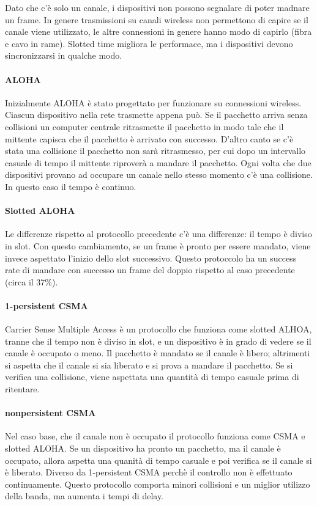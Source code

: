 \documentclass{article}
\begin{document}
Dato che c'è solo un canale, i dispositivi non possono segnalare di poter
madnare un frame. In genere trasmissioni su canali wireless non permettono di
capire se il canale viene utilizzato, le altre connessioni in genere hanno modo
di capirlo (fibra e cavo in rame).
Slotted time migliora le performace, ma i dispositivi devono sincronizzarsi in
qualche modo.

\paragraph{ALOHA}
Inizialmente ALOHA è stato progettato per funzionare su connessioni wireless.
Ciascun dispositivo nella rete trasmette appena può. Se il pacchetto arriva
senza collisioni un computer centrale ritrasmette il pacchetto in modo tale che
il mittente capisca che il pacchetto è arrivato con successo. D'altro canto se
c'è stata una collisione il pacchetto non sarà ritrasmesso, per cui dopo un
intervallo casuale di tempo il mittente riproverà a mandare il pacchetto. Ogni
volta che due dispositivi provano ad occupare un canale nello stesso momento c'è
una collisione. In questo caso il tempo è continuo.

\paragraph{Slotted ALOHA}
Le differenze rispetto al protocollo precedente c'è una differenze: il tempo è
diviso in slot. Con questo cambiamento, se un frame è pronto per essere
mandato, viene invece aspettato l'inizio dello slot successivo. Questo
protoccolo ha un success rate di mandare con successo un frame del doppio
rispetto al caso precedente (circa il 37\%).

\paragraph{1-persistent CSMA}
Carrier Sense Multiple Access è un protocollo che funziona come slotted ALHOA,
tranne che il tempo non è diviso in slot, e un dispositivo è in grado di vedere
se il canale è occupato o meno. Il pacchetto è mandato se il canale è libero;
altrimenti si aspetta che il canale si sia liberato e si prova a mandare il
pacchetto. Se si verifica una collisione, viene aspettata una quantità di tempo
casuale prima di ritentare.

\paragraph{nonpersistent CSMA}
Nel caso base, che il canale non è occupato il protocollo funziona come CSMA e
slotted ALOHA. Se un dispositivo ha pronto un pacchetto, ma il canale è
occupato, allora aspetta una quanità di tempo casuale e poi verifica se il
canale si è liberato. Diverso da 1-persistent CSMA perchè il controllo non è
effettuato continuamente. Questo protocollo comporta minori collisioni e un
miglior utilizzo della banda, ma aumenta i tempi di delay.
\end{document}
